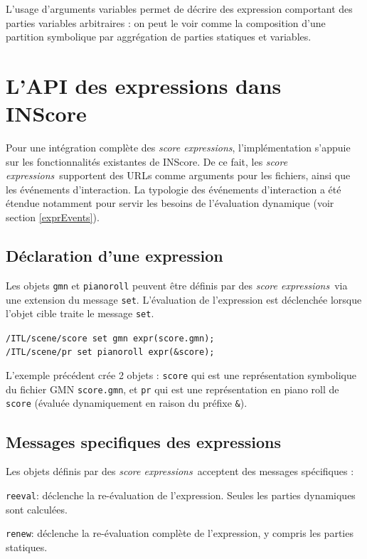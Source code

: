\documentclass{article}
\newcommand{\OSC}[1]{\texttt{#1}}
\newcommand{\sExprs}{\emph{score expressions}}
\let\olditemize\itemize
\let\oldenditemize\enditemize
\renewenvironment{itemize} 	{\olditemize \setlength{\itemsep}{1mm}}{\oldenditemize}
\newcommand{\sample}	[1]			{\vspace{-0.2em}\begin{center}\colorbox{mygrey}{\begin{minipage}[t]{0.97\columnwidth} {\small \texttt{#1}}\end{minipage}}\end{center}}
\begin{document}
L'usage d'arguments variables permet de décrire des expression comportant des parties variables arbitraires : on peut le voir comme la composition d'une partition symbolique par aggrégation de parties statiques et variables.

\section{L'API des expressions dans INScore}
\label{exprAPI}

Pour une intégration complète des \sExprs, l'implémentation s'appuie sur les fonctionnalités existantes de INScore. De ce fait, les \sExprs\ supportent des URLs comme arguments pour les fichiers, ainsi que les événements d'interaction. La typologie des événements d'interaction a été étendue notamment pour servir les besoins de l'évaluation dynamique (voir section \ref{exprEvents}).

\subsection{Déclaration d'une expression}
\label{declaringExpr}
Les objets \OSC{gmn} et \OSC{pianoroll} peuvent être définis par des \sExprs\ via une extension du message \OSC{set}.
L'évaluation de l'expression est déclenchée lorsque l'objet cible traite le message \OSC{set}.

\sample{/ITL/scene/score set gmn expr(score.gmn); \\
/ITL/scene/pr set pianoroll expr(\&score);
}

L'exemple précédent crée 2 objets : \OSC{score} qui est une représentation symbolique du fichier GMN \OSC{score.gmn}, et \OSC{pr} qui est une représentation en piano roll de \OSC{score} (évaluée dynamiquement en raison du préfixe  \OSC{\&}).


\subsection{Messages specifiques des expressions}
\label{exprMsgs}
Les objets définis par des \sExprs\ acceptent des messages spécifiques :
\begin{itemize}
\item \OSC{reeval}: déclenche la re-évaluation de l'expression. Seules les parties dynamiques sont calculées.
\item \OSC{renew}: déclenche la re-évaluation complète de l'expression, y compris les parties statiques. 
\end{itemize}
\end{document}
